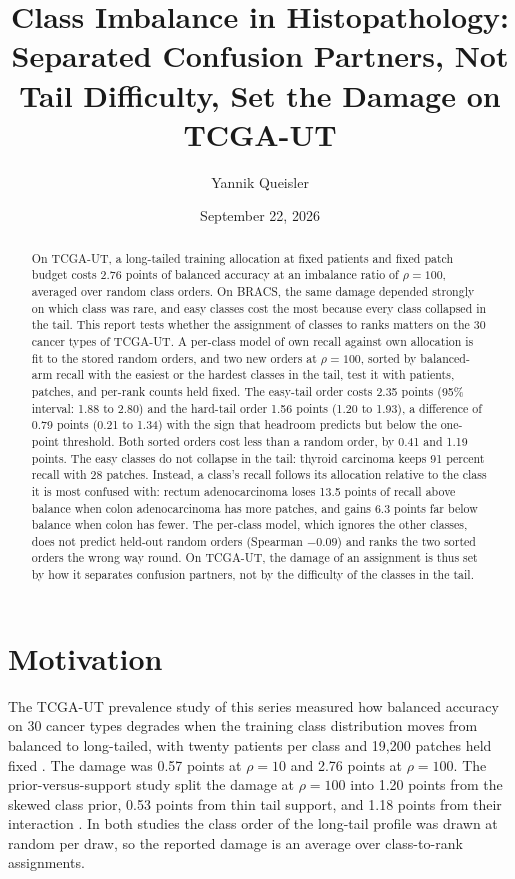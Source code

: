 \documentclass[11pt]{article}
\title{Class Imbalance in Histopathology:\\Separated Confusion Partners, Not Tail Difficulty, Set the Damage on TCGA-UT}
\author{Yannik Queisler}
\date{September 22, 2026}
\begin{document}
\raggedbottom
{}
\setlength{\emergencystretch}{2em}
\maketitle
\begin{abstract}
\noindent On TCGA-UT, a long-tailed training allocation at fixed patients and fixed patch budget costs 2.76 points of balanced accuracy at an imbalance ratio of $\rho=100$, averaged over random class orders. On BRACS, the same damage depended strongly on which class was rare, and easy classes cost the most because every class collapsed in the tail. This report tests whether the assignment of classes to ranks matters on the 30 cancer types of TCGA-UT. A per-class model of own recall against own allocation is fit to the stored random orders, and two new orders at $\rho=100$, sorted by balanced-arm recall with the easiest or the hardest classes in the tail, test it with patients, patches, and per-rank counts held fixed. The easy-tail order costs 2.35 points (95\% interval: 1.88 to 2.80) and the hard-tail order 1.56 points (1.20 to 1.93), a difference of 0.79 points (0.21 to 1.34) with the sign that headroom predicts but below the one-point threshold. Both sorted orders cost less than a random order, by 0.41 and 1.19 points. The easy classes do not collapse in the tail: thyroid carcinoma keeps 91 percent recall with 28 patches. Instead, a class's recall follows its allocation relative to the class it is most confused with: rectum adenocarcinoma loses 13.5 points of recall above balance when colon adenocarcinoma has more patches, and gains 6.3 points far below balance when colon has fewer. The per-class model, which ignores the other classes, does not predict held-out random orders (Spearman $-0.09$) and ranks the two sorted orders the wrong way round. On TCGA-UT, the damage of an assignment is thus set by how it separates confusion partners, not by the difficulty of the classes in the tail.
\end{abstract}

\section{Motivation}
\label{sec:motivation}
The TCGA-UT prevalence study of this series measured how balanced accuracy on 30 cancer types degrades when the training class distribution moves from balanced to long-tailed, with twenty patients per class and 19,200 patches held fixed \citep{queisler2026prevalenceTcga}. The damage was 0.57 points at $\rho=10$ and 2.76 points at $\rho=100$. The prior-versus-support study split the damage at $\rho=100$ into 1.20 points from the skewed class prior, 0.53 points from thin tail support, and 1.18 points from their interaction \citep{queisler2026causeTcga}. In both studies the class order of the long-tail profile was drawn at random per draw, so the reported damage is an average over class-to-rank assignments.
\end{document}
